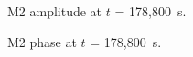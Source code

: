 \begin{figure}[H]
 \centering
  \caption{M2 amplitude at $t$ = 178,800~s.}\label{fig:m2wave:Ampli}
\end{figure}

\begin{figure}[H]
 \centering
  \caption{M2 phase at $t$ = 178,800~s.}\label{fig:m2wave:Phase}
\end{figure}
